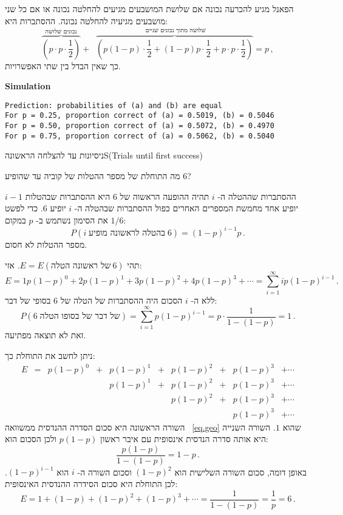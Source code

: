 \solution{}

הפאנל מגיע להכרעה נכונה אם שלושת המושבעים מגיעים להחלטה נכונה או אם כל שני מושבעים מגיעיה להחלטה נכונה. ההסתברות היא:
\[
\overbrace{\left(p\cdot p\cdot\frac{1}{2}\right)}^{\textrm{נכונים שלושה}}+\;\;\overbrace{\left(p(1-p)\cdot\frac{1}{2}+(1-p)p\cdot\frac{1}{2}+p\cdot p\cdot\frac{1}{2}\right)}^{\textrm{ שלושה מתוך נכונים שניים}}=p\,,
\]
כך שאין הבדל בין שתי האפשרויות.

\textbf{Simulation}
\begin{verbatim}
Prediction: probabilities of (a) and (b) are equal
For p = 0.25, proportion correct of (a) = 0.5019, (b) = 0.5046
For p = 0.50, proportion correct of (a) = 0.5072, (b) = 0.4970
For p = 0.75, proportion correct of (a) = 0.5062, (b) = 0.5040
\end{verbatim}


\begin{prob}{ניסיונות עד להצלחה הראשונה}{S}{(Trials until first success)}

\label{p.four}
מה התוחלת של מספר ההטלות של קוביה עד שהופיע $6$?
\end{prob}


ההסתברות שההטלה ה-%
$i$
תהיה ההופעה הראשוה של 
$6$
היא ההסתברות שבהטלות
$i-1$
יופיע אחד מחמשת המספרים האחרים כפול ההסתברות שבהטלה ה-%
$i$
יופיע 
$6$.
כדי לפשט את הסימון נשתמש ב-%
$p$
במקום
$1/6$:
\[
P(i\;\textrm{בהטלה לראשונה מופיע}\;6)=(1-p)^{i-1}p\,.
\]
מספר ההטלות לא חסום.

תהי
$E=E(\textrm{של ראשונה הטלה}\:6)$.
אזי:
\begin{equation}\label{eq.expectation}
E=1p(1-p)^0 + 2p(1-p)^1+ 3p(1-p)^2+ 4p(1-p)^3 +\cdots =\sum_{i=1}^{\infty} ip(1-p)^{i-1}\,.
\end{equation}
ללא ה-
$i$
הסכום היה ההסתברות של הטלה של $6$ בסופי של דבר:
\begin{equation}\label{eq.geo}
P(6\;\textrm{של דבר של בסופו הטלה})= \sum_{i=1}^{\infty} p(1-p)^{i-1}=p\cdot\frac{1}{1-(1-p)}=1\,.
\end{equation}
זאת לא תוצאה מפתיעה.

ניתן לחשב את התוחלת כך:
\[
\begin{array}{llllllllll}
E&=&p(1-p)^0 &+& p(1-p)^1&+& p(1-p)^2&+& p(1-p)^3 &+\cdots \\
& & &&p(1-p)^1&+& p(1-p)^2&+& p(1-p)^3 &+\cdots \\
&  &&&& &p(1-p)^2&+& p(1-p)^3 &+\cdots \\
&&&&&&&&p(1-p)^3 &+\cdots
\end{array}
\]
השורה הראשונה היא סכום הסדרה ההנדסית ממשוואה%
~\ref{eq.geo}
שהוא
$1$.
השורה השנייה היא אותה סדרה הנדסית אינסופית עם איבר ראשון 
$p(1-p)$
ולכן הסכום הוא:
\[
\frac{p(1-p)}{1-(1-p)}=1-p\,.
\]
באופן דומה, סכום השורה השלישית הוא
$(1-p)^2$ 
וסכום השורה ה-%
$i$
הוא
$(1-p)^{i-1}$.
לכן התוחלת היא סכום הסידרה ההנדסית האינסופית:
\[
E= 1 + (1-p) + (1-p)^2 + (1-p)^3 + \cdots= \frac{1}{1-(1-p)}=\frac{1}{p}=6\,.
\]

